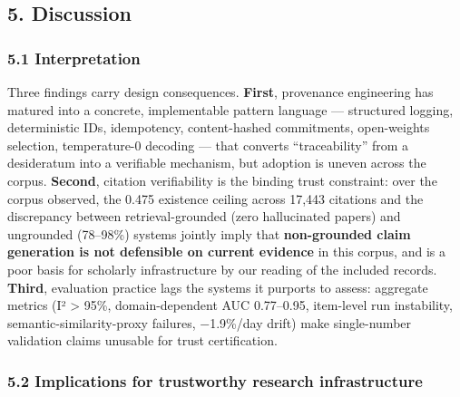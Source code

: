 \documentclass[11pt]{article}
\begin{document}
\subsection{5. Discussion}\label{discussion}

\subsubsection{5.1 Interpretation}\label{interpretation}

Three findings carry design consequences. \textbf{First}, provenance
engineering has matured into a concrete, implementable pattern language
--- structured logging, deterministic IDs, idempotency, content-hashed
commitments, open-weights selection, temperature-0 decoding --- that
converts ``traceability'' from a desideratum into a verifiable
mechanism, but adoption is uneven across the corpus. \textbf{Second},
citation verifiability is the binding trust constraint: over the corpus
observed, the 0.475 existence ceiling across 17,443 citations and the
discrepancy between retrieval-grounded (zero hallucinated papers) and
ungrounded (78--98\%) systems jointly imply that \textbf{non-grounded
claim generation is not defensible on current evidence} in this corpus,
and is a poor basis for scholarly infrastructure by our reading of the
included records. \textbf{Third}, evaluation practice lags the systems
it purports to assess: aggregate metrics (I² \textgreater{} 95\%,
domain-dependent AUC 0.77--0.95, item-level run instability,
semantic-similarity-proxy failures, −1.9\%/day drift) make single-number
validation claims unusable for trust certification.

\subsubsection{5.2 Implications for trustworthy research
infrastructure}\label{implications-for-trustworthy-research-infrastructure}
\end{document}
